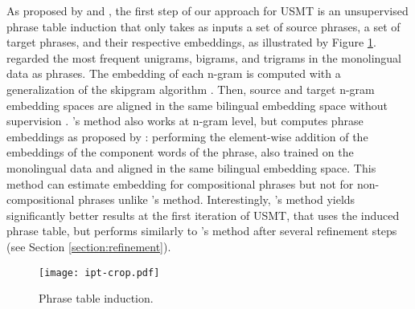 \documentclass[11pt,a4paper]{article}
\begin{document}
As proposed by \citet{artetxe2018unsupervised} and \citet{DBLP:journals/corr/abs-1804-07755}, the first step of our approach for USMT is an unsupervised phrase table induction that only takes as inputs a set of source phrases, a set of target phrases, and their respective embeddings, as illustrated by Figure \ref{fig:ipt}.
\citet{artetxe2018unsupervised} regarded the most frequent unigrams, bigrams, and trigrams in the monolingual data as phrases. The embedding of each n-gram is computed with a generalization of the skipgram algorithm \citep{Mikolov:2013:DRW:2999792.2999959}. Then, source and target n-gram embedding spaces are aligned in the same bilingual embedding space without supervision \citep{P18-1073}. \citet{DBLP:journals/corr/abs-1804-07755}'s method also works at n-gram level, but computes phrase embeddings as proposed by \citet{N15-1176}: performing the element-wise addition of the embeddings of the component words of the phrase, also trained on the monolingual data and aligned in the same bilingual embedding space. This method can estimate embedding for compositional phrases but not for non-compositional phrases unlike \citet{artetxe2018unsupervised}'s method. Interestingly, \citet{artetxe2018unsupervised}'s method yields significantly better results at the first iteration of USMT, that uses the induced phrase table, but performs similarly to \citet{DBLP:journals/corr/abs-1804-07755}'s method after several refinement steps (see Section \ref{section:refinement}).

\begin{figure}[t]
    \centering
            \texttt{[image: ipt-crop.pdf]}
    \caption{\label{fig:ipt} Phrase table induction.}
\end{figure}
\end{document}
